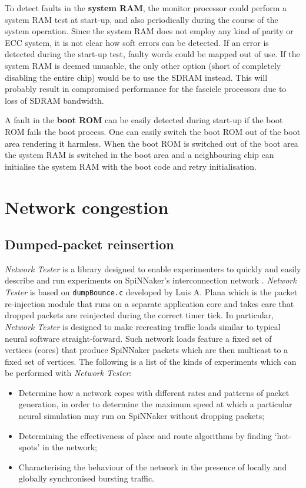 \documentclass[oneside, a4paper, 11pt]{memoir}
\newlength\drop
\begin{document}
To detect faults in the \textbf{system RAM}, the monitor processor could perform a system RAM test at start-up, and also periodically during the course of the system operation. Since the system RAM does not employ any kind of parity or ECC system, it is not clear how soft errors can be detected. If an error is detected during the start-up test, faulty words could be mapped out of use. If the system RAM is deemed unusable, the only other option (short of completely disabling the entire chip) would be to use the SDRAM instead. This will probably result in compromised performance for the fascicle processors due to loss of SDRAM bandwidth.

A fault in the \textbf{boot ROM} can be easily detected during start-up if the boot ROM fails the boot process. One can easily switch the boot ROM out of the boot area rendering it harmless. When the boot ROM is switched out of the boot area the system RAM is switched in the boot area and a neighbouring chip can initialise the system RAM with the boot code and retry initialisation.

\chapter{Network congestion}
\label{sec:congestion}

\section{Dumped-packet reinsertion}

 
\emph{Network Tester} is a library designed to enable experimenters to quickly and easily describe and run experiments on SpiNNaker's interconnection network \citep{heathcote2015networktester}. \emph{Network Tester} is based on \verb|dumpBounce.c| developed by Luis A. Plana which is the packet re-injection module that runs on a separate application core and takes care that dropped packets are reinjected during the correct timer tick. In particular, \emph{Network Tester} is designed to make recreating traffic loads similar to typical neural software straight-forward. Such network loads feature a fixed set of vertices (cores) that produce SpiNNaker packets which are then multicast to a fixed set of vertices. The following is a list of the kinds of experiments which can be performed with \emph{Network Tester}:
\begin{itemize}
\item Determine how a network copes with different rates and patterns of packet generation, in order to determine the maximum speed at which a particular neural simulation may run on SpiNNaker without dropping packets;
\item Determining the effectiveness of place and route algorithms by finding `hot-spots' in the network;
\item Characterising the behaviour of the network in the presence of locally and globally synchronised bursting traffic.
\end{itemize}
\end{document}
